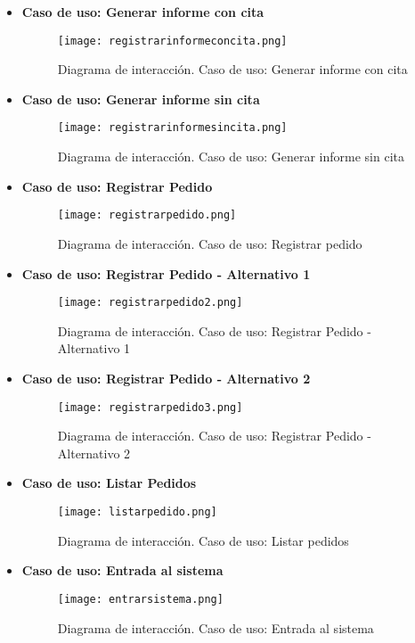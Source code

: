 \begin{itemize}
\newpage
\item \textbf{Caso de uso: Generar informe con cita}
\begin{figure}[!htb]
  \centering
  \texttt{[image: registrarinformeconcita.png]}
  \caption{Diagrama de interacción. Caso de uso: Generar informe con cita}
  \label{a}
\end{figure}
\newpage
\item \textbf{Caso de uso: Generar informe sin cita}
\begin{figure}[!htb]
  \centering
  \texttt{[image: registrarinformesincita.png]}
  \caption{Diagrama de interacción. Caso de uso: Generar informe sin cita}
  \label{a}
\end{figure}

\newpage
\item \textbf{Caso de uso: Registrar Pedido}
\begin{figure}[!htb]
  \centering
    \texttt{[image: registrarpedido.png]}
  \caption{Diagrama de interacción. Caso de uso: Registrar pedido}
  \label{a}
\end{figure}
\newpage

\newpage
\item \textbf{Caso de uso: Registrar Pedido - Alternativo 1}
\begin{figure}[!htb]
  \centering
    \texttt{[image: registrarpedido2.png]}
  \caption{Diagrama de interacción. Caso de uso: Registrar Pedido - Alternativo 1}
  \label{a}
\end{figure}

\item \textbf{Caso de uso: Registrar Pedido - Alternativo 2}
\begin{figure}[!htb]
  \centering
    \texttt{[image: registrarpedido3.png]}
  \caption{Diagrama de interacción. Caso de uso: Registrar Pedido - Alternativo 2}
  \label{a}
\end{figure}

\newpage
\item \textbf{Caso de uso: Listar Pedidos}
\begin{figure}[!htb]
  \centering
    \texttt{[image: listarpedido.png]}
  \caption{Diagrama de interacción. Caso de uso: Listar pedidos}
  \label{a}
\end{figure}

\item \textbf{Caso de uso: Entrada al sistema}
\begin{figure}[!htb]
  \centering
    \texttt{[image: entrarsistema.png]}
  \caption{Diagrama de interacción. Caso de uso: Entrada al sistema}
  \label{a}
\end{figure}


\end{itemize}
